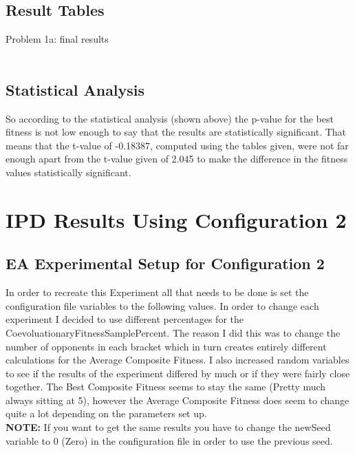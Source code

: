 \documentclass[•]{article}
\begin{document}
\pagebreak
\subsection{Result Tables}
Problem 1a: final results\\\\

\pagebreak
\subsection{Statistical Analysis}
\indent So according to the statistical analysis (shown above) the p-value for the best fitness is not low enough to say that the results are statistically significant.  That means that the t-value of -0.18387, computed using the tables given, were not far enough apart from the t-value given of 2.045 to make the difference in the fitness values statistically significant.


\pagebreak
\section{IPD Results Using Configuration 2}

\subsection{EA Experimental Setup for Configuration 2}
\indent \indent In order to recreate this Experiment all that needs to be done is set the configuration file variables to the following values.  In order to change each experiment I decided to use different percentages for the CoevoluationaryFitnessSamplePercent.  The reason I did this was to change the number of opponents in each bracket which in turn creates entirely different calculations for the Average Composite Fitness.  I also increased random variables to see if the results of the experiment differed by much or if they were fairly close together.  The Best Composite Fitness seems to stay the same (Pretty much always sitting at 5), however the Average Composite Fitness does seem to change quite a lot depending on the parameters set up.\\
\indent \textbf{NOTE:} If you want to get the same results you have to change the newSeed variable to 0 (Zero) in the configuration file in order to use the previous seed.\\
\end{document}
